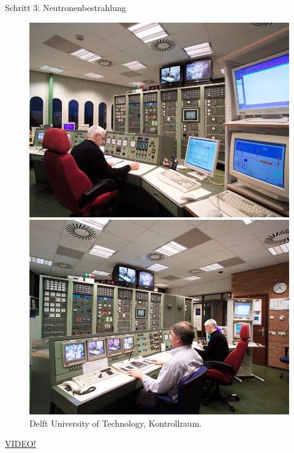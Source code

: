 \documentclass[xcolor=x11names, aspectratio=169]{beamer}
\begin{document}
\begin{frame}{Schritt 3: Neutronenbestrahlung}
\begin{figure}
\begin{minipage}{0.48\textwidth}
\includegraphics[width=\textwidth]{img/control-1.jpg}
\end{minipage}\hfill
\begin{minipage}{0.48\textwidth}
\includegraphics[width=\textwidth]{img/control-2.jpg}
\end{minipage}
\caption{Delft University of Technology, Kontrollraum.}
\end{figure}\vspace*{-1em}
\begin{center}
\href{run:/home/felix/naa.asf}{VIDEO!}
\end{center}
\end{frame}
\end{document}
